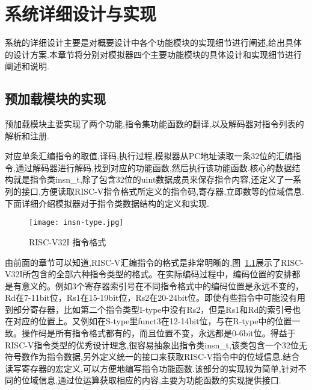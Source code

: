 
\chapter{系统详细设计与实现}

系统的详细设计主要是对概要设计中各个功能模块的实现细节进行阐述,给出具体的设计方案.本章节将分别对模拟器四个主要功能模块的具体设计和实现细节进行阐述和说明.

\section{预加载模块的实现}

预加载模块主要实现了两个功能,指令集功能函数的翻译,以及解码器对指令列表的解析和注册.

对应单条汇编指令的取值,译码,执行过程,模拟器从PC地址读取一条32位的汇编指令,通过解码器进行解码,找到对应的功能函数,然后执行该功能函数.核心的数据结构就是指令类insn\_t,除了包含32位的uint数据成员来保存指令内容,还定义了一系列的接口,方便读取RISC-V指令格式所定义的指令码,寄存器,立即数等的位域信息.下面详细介绍模拟器对于指令类数据结构的定义和实现.
\begin{figure}[h]
    \centering
    \texttt{[image: insn-type.jpg]}
    \caption{RISC-V32I 指令格式}
    \label{fig:insn-type}
\end{figure}


由前面的章节可以知道,RISC-V汇编指令的格式是非常明晰的,图~\ref{fig:insn-type}展示了RISC-V32I所包含的全部六种指令类型的格式。在实际编码过程中，编码位置的安排都是有意义的。例如3个寄存器索引号在不同指令格式中的编码位置是永远不变的，Rd在7-11bit位，Rs1在15-19bit位，Rs2在20-24bit位。即使有些指令中可能没有用到部分寄存器，比如第二个指令类型I-type中没有Rs2，但是Rs1和Rd的索引号也在对应的位置上。又例如在S-type里funct3在12-14bit位，与在R-type中的位置一致。操作码是所有指令格式都有的，而且位置不变，永远都是0-6bit位。得益于RISC-V指令类型的优秀设计理念,很容易抽象出指令类insn\_t,该类包含一个32位无符号数作为指令数据,另外定义统一的接口来获取RISC-V指令中的位域信息.结合读写寄存器的宏定义,可以方便地编写指令功能函数.该部分的实现较为简单,针对不同的位域信息,通过位运算获取相应的内容,主要为功能函数的实现提供接口.


